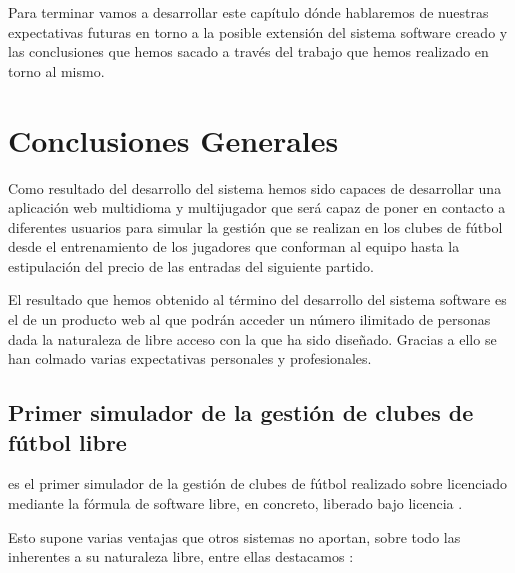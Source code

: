 

Para terminar vamos a desarrollar este capítulo dónde hablaremos de nuestras
expectativas futuras en torno a la posible extensión del sistema software creado
y las conclusiones que hemos sacado a través del trabajo que hemos realizado en
torno al mismo.

\section{Conclusiones Generales}
Como resultado del desarrollo del sistema 
hemos sido capaces de desarrollar una aplicación web multidioma y multijugador
que será capaz de poner en contacto a diferentes usuarios para simular la
gestión que se realizan en los clubes de fútbol desde el entrenamiento de los
jugadores que conforman al equipo hasta la estipulación del precio de las
entradas del siguiente partido.

El resultado que hemos obtenido al término del desarrollo del sistema software
es el de un producto web al que podrán acceder un número ilimitado de personas
dada la naturaleza de libre acceso con la que ha sido diseñado. Gracias a ello
se han colmado varias expectativas personales y profesionales.


\subsection{Primer simulador de la gestión de clubes de fútbol libre}
 es el primer simulador de la gestión de
clubes de fútbol realizado sobre  licenciado mediante la fórmula de software libre, en concreto,
liberado bajo licencia .

Esto supone varias ventajas que otros sistemas no aportan, sobre todo las
inherentes a su naturaleza libre, entre ellas destacamos \cite{fsf:what_is}:

